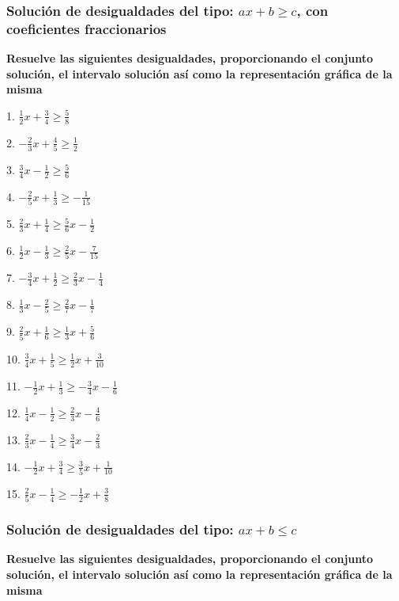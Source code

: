 \documentclass[12pt]{article}
\begin{document}
\subsubsection{\texorpdfstring{Solución de desigualdades del tipo:
\(ax+b \geq c\), con coeficientes
fraccionarios}{Solución de desigualdades del tipo: ax+b \textbackslash geq c, con coeficientes fraccionarios}}\label{soluciuxf3n-de-desigualdades-del-tipo-axb-geq-c-con-coeficientes-fraccionarios}
\textbf{Resuelve las siguientes desigualdades, proporcionando el
conjunto solución, el intervalo solución así como la representación
gráfica de la misma}

\begin{multicols}{2}
1. $\frac{1}{2}x + \frac{3}{4} \geq \frac{5}{8}$

2. $-\frac{2}{3}x + \frac{4}{5} \geq \frac{1}{2}$

3. $\frac{3}{4}x - \frac{1}{2} \geq \frac{5}{6}$

4. $-\frac{2}{5}x + \frac{1}{3} \geq -\frac{1}{15}$

5. $\frac{2}{3}x + \frac{1}{4} \geq \frac{5}{6}x - \frac{1}{2}$

6. $\frac{1}{2}x - \frac{1}{3} \geq \frac{2}{5}x - \frac{7}{15}$

7. $-\frac{3}{4}x + \frac{1}{2} \geq \frac{2}{3}x - \frac{1}{4}$

8. $\frac{1}{3}x - \frac{2}{5} \geq \frac{2}{7}x - \frac{1}{7}$

9. $\frac{2}{5}x + \frac{1}{6} \geq \frac{1}{3}x + \frac{5}{6}$

10. $\frac{3}{4}x + \frac{1}{5} \geq \frac{1}{2}x + \frac{3}{10}$

11. $-\frac{1}{2}x + \frac{1}{3} \geq -\frac{3}{4}x - \frac{1}{6}$

12. $\frac{1}{4}x - \frac{1}{2} \geq \frac{2}{3}x - \frac{4}{6}$

13. $\frac{2}{3}x - \frac{1}{4} \geq \frac{3}{4}x - \frac{2}{3}$

14. $-\frac{1}{2}x + \frac{3}{4} \geq \frac{3}{5}x + \frac{1}{10}$

15. $\frac{2}{5}x - \frac{1}{4} \geq -\frac{1}{2}x + \frac{3}{8}$
\end{multicols}

\subsubsection{\texorpdfstring{Solución de desigualdades del tipo:
\(ax+b \leq c\)}{Solución de desigualdades del tipo: ax+b \textbackslash leq c}}\label{soluciuxf3n-de-desigualdades-del-tipo-axb-leq-c}
\textbf{Resuelve las siguientes desigualdades, proporcionando el
conjunto solución, el intervalo solución así como la representación
gráfica de la misma}
\end{document}
